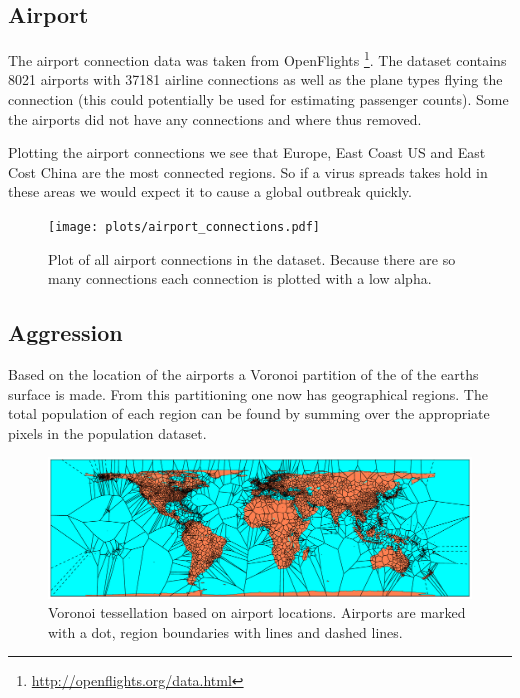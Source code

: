 \subsection{Airport}

The airport connection data was taken from OpenFlights \footnote{\url{http://openflights.org/data.html}}. The dataset contains 8021 airports with 37181 airline connections as well as the plane types flying the connection (this could potentially be used for estimating passenger counts). Some the airports did not have any connections and where thus removed.

Plotting the airport connections we see that Europe, East Coast US and East Cost China are the most connected regions. So if a virus spreads takes hold in these areas we would expect it to cause a global outbreak quickly.

\begin{figure}[H]
	\centering
	\texttt{[image: plots/airport\_connections.pdf]}
	\caption{Plot of all airport connections in the dataset. Because there are so many connections each connection is plotted with a low alpha.}
\end{figure}

\subsection{Aggression}

Based on the location of the airports a Voronoi partition of the of the earths surface is made. From this partitioning one now has geographical regions. The total population of each region can be found by summing over the appropriate pixels in the population dataset.

\begin{figure}[H]
	\centering
	\includegraphics[width=1.0 \textwidth]{plots/voronoi.pdf}
	\caption{Voronoi tessellation based on airport locations. Airports are marked with a dot, region boundaries with lines and dashed lines.}
\end{figure}

